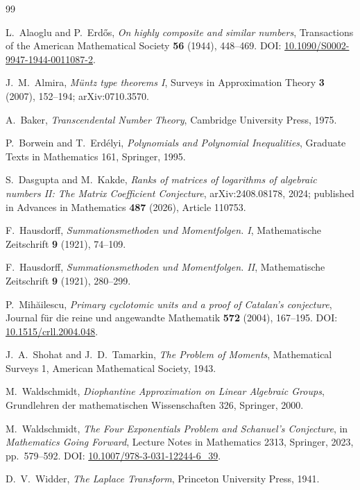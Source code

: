 \documentclass[11pt,oneside]{article}
\theoremstyle{definition}
\theoremstyle{remark}
\begin{document}
\begin{thebibliography}{99}

L.~Alaoglu and P.~Erd\H{o}s,
\newblock \emph{On highly composite and similar numbers},
\newblock Transactions of the American Mathematical Society \textbf{56} (1944), 448--469.
\newblock DOI: \href{https://doi.org/10.1090/S0002-9947-1944-0011087-2}
{10.1090/S0002-9947-1944-0011087-2}.

J.~M.~Almira,
\newblock \emph{M\"untz type theorems I},
\newblock Surveys in Approximation Theory \textbf{3} (2007), 152--194;
\newblock arXiv:0710.3570.

A.~Baker,
\newblock \emph{Transcendental Number Theory},
\newblock Cambridge University Press, 1975.

P.~Borwein and T.~Erd\'elyi,
\newblock \emph{Polynomials and Polynomial Inequalities},
\newblock Graduate Texts in Mathematics 161, Springer, 1995.

S.~Dasgupta and M.~Kakde,
\newblock \emph{Ranks of matrices of logarithms of algebraic numbers II: The Matrix
Coefficient Conjecture},
\newblock arXiv:2408.08178, 2024; published in Advances in Mathematics \textbf{487} (2026),
Article 110753.

F.~Hausdorff,
\newblock \emph{Summationsmethoden und Momentfolgen. I},
\newblock Mathematische Zeitschrift \textbf{9} (1921), 74--109.

F.~Hausdorff,
\newblock \emph{Summationsmethoden und Momentfolgen. II},
\newblock Mathematische Zeitschrift \textbf{9} (1921), 280--299.

P.~Mih\u{a}ilescu,
\newblock \emph{Primary cyclotomic units and a proof of Catalan's conjecture},
\newblock Journal f\"ur die reine und angewandte Mathematik \textbf{572} (2004), 167--195.
\newblock DOI: \href{https://doi.org/10.1515/crll.2004.048}{10.1515/crll.2004.048}.

J.~A.~Shohat and J.~D.~Tamarkin,
\newblock \emph{The Problem of Moments},
\newblock Mathematical Surveys 1, American Mathematical Society, 1943.

M.~Waldschmidt,
\newblock \emph{Diophantine Approximation on Linear Algebraic Groups},
\newblock Grundlehren der mathematischen Wissenschaften 326, Springer, 2000.

M.~Waldschmidt,
\newblock \emph{The Four Exponentials Problem and Schanuel's Conjecture},
\newblock in \emph{Mathematics Going Forward}, Lecture Notes in Mathematics 2313,
Springer, 2023, pp.~579--592.
\newblock DOI: \href{https://doi.org/10.1007/978-3-031-12244-6_39}
{10.1007/978-3-031-12244-6\_39}.

D.~V.~Widder,
\newblock \emph{The Laplace Transform},
\newblock Princeton University Press, 1941.

\end{thebibliography}
\end{document}
